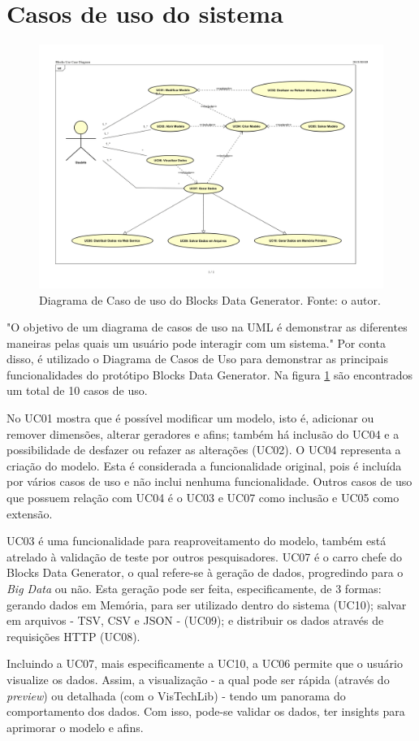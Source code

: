 \documentclass[
	12pt,				%
	openright,			%
	twoside,			%
	a4paper,			%
	english,			%
	brazil				%
	]{abntex2}
\begin{document}
	\section{Casos de uso do sistema}
		\begin{figure}[h!]
			\centering
			\includegraphics[width=\linewidth]{./figures/prototipo/diagramaUC.png}
			\caption{Diagrama de Caso de uso do Blocks Data Generator. Fonte: o autor.}
			\label{fig:diagramaUC}
		\end{figure}
		"O objetivo de um diagrama de casos de uso na UML é demonstrar as diferentes maneiras pelas quais um usuário pode interagir com um sistema." \cite{UCdefinition}
		Por conta disso, é utilizado o Diagrama de Casos de Uso para demonstrar as principais funcionalidades do protótipo Blocks Data Generator.
		Na figura \ref{fig:diagramaUC} são encontrados um total de 10 casos de uso.
		\par
		No UC01 mostra que é possível modificar um modelo, isto é, adicionar ou remover dimensões, alterar geradores e afins; também há inclusão do UC04 e a possibilidade de desfazer ou refazer as alterações (UC02).
		O UC04 representa a criação do modelo. 
		Esta é considerada a funcionalidade original, pois é incluída por vários casos de uso e não inclui nenhuma funcionalidade.
		Outros casos de uso que possuem relação com UC04 é o UC03 e UC07 como inclusão e UC05 como extensão.
		\par
		UC03 é uma funcionalidade para reaproveitamento do modelo, também está atrelado à validação de teste por outros pesquisadores.
		UC07 é o carro chefe do Blocks Data Generator, o qual refere-se à geração de dados, progredindo para o \emph{Big Data} ou não.
		Esta geração pode ser feita, especificamente, de 3 formas: gerando dados em Memória, para ser utilizado dentro do sistema (UC10);
			salvar em arquivos - TSV, CSV e JSON - (UC09);
			e distribuir os dados através de requisições HTTP (UC08).
		\par
		Incluindo a UC07, mais especificamente a UC10, a UC06 permite que o usuário visualize os dados. 
		Assim, a visualização - a qual pode ser rápida (através do \emph{preview}) ou detalhada (com o VisTechLib) - tendo um panorama do comportamento dos dados. 
		Com isso, pode-se validar os dados, ter insights para aprimorar o modelo e afins.
\end{document}

